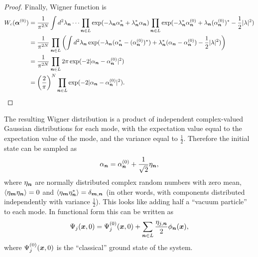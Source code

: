 \begin{proof}
Finally, Wigner function is
\begin{equation*}
\begin{split}
	W_c (\bm{\alpha}^{(0)})
	& = \frac{1}{\pi^{2N}} \int d^2\lambda_{\boldsymbol{n}} \dots
		\prod_{\boldsymbol{n} \in L} \exp(
			- \lambda_{\boldsymbol{n}} \alpha_{\boldsymbol{n}}^*
			+ \lambda_{\boldsymbol{n}}^* \alpha_{\boldsymbol{n}}
		)
		\prod_{\boldsymbol{n} \in L} \exp(
			- \lambda_{\boldsymbol{n}}^* \alpha_{\boldsymbol{n}}^{(0)}
			+ \lambda_{\boldsymbol{n}} (\alpha_{\boldsymbol{n}}^{(0)})^*
			- \frac{1}{2} |\lambda|^2
		) \\
	& = \frac{1}{\pi^{2N}} \prod_{\boldsymbol{n} \in L} \left(
		\int d^2\lambda_{\boldsymbol{n}}
			\exp(
				- \lambda_{\boldsymbol{n}} (\alpha_{\boldsymbol{n}}^* - (\alpha_{\boldsymbol{n}}^{(0)})^*)
				+ \lambda_{\boldsymbol{n}}^* (\alpha_{\boldsymbol{n}} - \alpha_{\boldsymbol{n}}^{(0)})
				- \frac{1}{2} |\lambda|^2
			)
	\right) \\
	& = \frac{1}{\pi^{2N}} \prod_{\boldsymbol{n} \in L}
		2 \pi \exp(-2 |\alpha_{\boldsymbol{n}} - \alpha_{\boldsymbol{n}}^{(0)}|^2) \\
	& = \left( \frac{2}{\pi} \right)^N \prod_{\boldsymbol{n} \in L}
		\exp(-2 |\alpha_{\boldsymbol{n}} - \alpha_{\boldsymbol{n}}^{(0)}|^2).
	\qedhere
\end{split}
\end{equation*}
\end{proof}

The resulting Wigner distribution is a product of independent complex-valued Gaussian distributions for each mode,
with the expectation value equal to the expectation value of the mode,
and the variance equal to $\frac{1}{2}$.
Therefore the initial state can be sampled as
\[
	\alpha_{\boldsymbol{n}} = \alpha_{\boldsymbol{n}}^{(0)} + \frac{1}{\sqrt{2}} \eta_{\boldsymbol{n}},
\]
where $\eta_{\boldsymbol{n}}$ are normally distributed complex random numbers with zero mean,
$\langle \eta_{\boldsymbol{m}} \eta_{\boldsymbol{n}} \rangle = 0$ and
$\langle \eta_{\boldsymbol{m}} \eta_{\boldsymbol{n}}^* \rangle = \delta_{\boldsymbol{m},\boldsymbol{n}}$
(in other words, with components distributed independently with variance $\frac{1}{2}$).
This looks like adding half a ``vacuum particle'' to each mode.
In functional form this can be written as
\[
	\Psi_j(\boldsymbol{x}, 0)
	= \Psi_j^{(0)}(\boldsymbol{x}, 0)
		+ \sum_{\boldsymbol{n} \in L} \frac{\eta_{j,\boldsymbol{n}}}{2} \phi_{\boldsymbol{n}}(\boldsymbol{x}),
\]
where $\Psi_j^{(0)}(\boldsymbol{x}, 0)$ is the ``classical'' ground state of the system.
